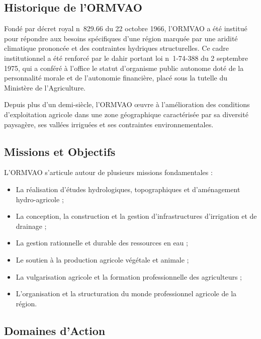 \documentclass[12pt,a4paper]{report}
\begin{document}
\subsection{Historique de l'ORMVAO}

Fondé par décret royal n\textdegree{}~829.66 du 22 octobre 1966, l'ORMVAO a été institué pour répondre aux besoins spécifiques d'une région marquée par une aridité climatique prononcée et des contraintes hydriques structurelles. Ce cadre institutionnel a été renforcé par le dahir portant loi n\textdegree{}~1-74-388 du 2 septembre 1975, qui a conféré à l'office le statut d'organisme public autonome doté de la personnalité morale et de l'autonomie financière, placé sous la tutelle du Ministère de l'Agriculture.

Depuis plus d'un demi-siècle, l'ORMVAO œuvre à l'amélioration des conditions d'exploitation agricole dans une zone géographique caractérisée par sa diversité paysagère, ses vallées irriguées et ses contraintes environnementales.

\subsection{Missions et Objectifs}

L'ORMVAO s'articule autour de plusieurs missions fondamentales :
\begin{itemize}
  \item La réalisation d'études hydrologiques, topographiques et d'aménagement hydro-agricole ;
  \item La conception, la construction et la gestion d'infrastructures d'irrigation et de drainage ;
  \item La gestion rationnelle et durable des ressources en eau ;
  \item Le soutien à la production agricole végétale et animale ;
  \item La vulgarisation agricole et la formation professionnelle des agriculteurs ;
  \item L'organisation et la structuration du monde professionnel agricole de la région.
\end{itemize}

\subsection{Domaines d'Action}
\end{document}
